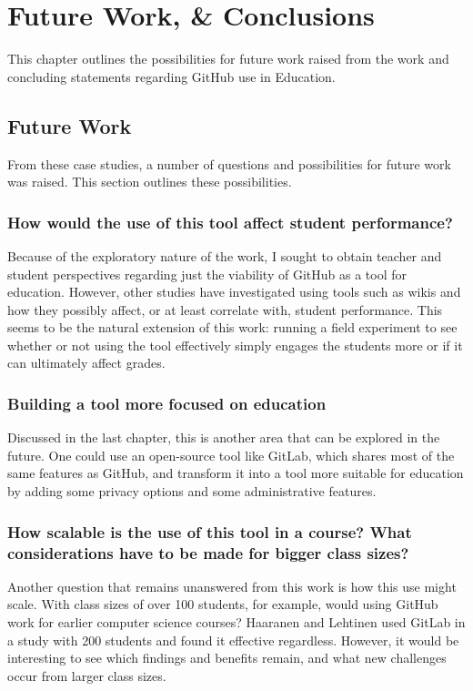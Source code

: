 \chapter{Future Work, \& Conclusions}

This chapter outlines the possibilities for future work raised from the work and concluding statements regarding GitHub use in Education.

\section{Future Work}
From these case studies, a number of questions and possibilities for future work was raised. This section outlines these possibilities.

\subsection{How would the use of this tool affect student performance?}
Because of the exploratory nature of the work, I sought to obtain teacher and student perspectives regarding just the viability of GitHub as a tool for education. However, other studies have investigated using tools such as wikis \cite{minocha2007collaborative} and how they possibly affect, or at least correlate with, student performance. This seems to be the natural extension of this work: running a field experiment to see whether or not using the tool effectively simply engages the students more or if it can ultimately affect grades.

\subsection{Building a tool more focused on education}
Discussed in the last chapter, this is another area that can be explored in the future. One could use an open-source tool like GitLab, which shares most of the same features as GitHub, and transform it into a tool more suitable for education by adding some privacy options and some administrative features.

\subsection{How scalable is the use of this tool in a course? What considerations have to be made for bigger class sizes?}
Another question that remains unanswered from this work is how this use might scale. With class sizes of over 100 students, for example, would using GitHub work for earlier computer science courses? Haaranen and Lehtinen \cite{haaranen2015teaching} used GitLab in a study with 200 students and found it effective regardless. However, it would be interesting to see which findings and benefits remain, and what new challenges occur from larger class sizes.

